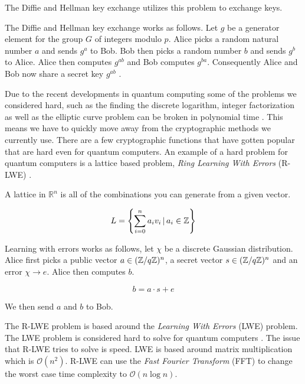 The Diffie and Hellman key exchange utilizes this problem to exchange keys.

\begin{definition}

    The Diffie and Hellman key exchange works as follows. Let $g$ be a generator
    element for the group $G$ of integers modulo $p$. Alice picks a random
    natural number $a$ and sends $g^a$ to Bob. Bob then picks a random number
    $b$ and sends $g^b$ to Alice. Alice then computes $g^{ab}$ and Bob computes
    $g^{ba}$. Consequently Alice and Bob now share a secret key $g^{ab}$
    \citep{FranciscoRodriguez-Henriquez10}.

\end{definition}

Due to the recent developments in quantum computing some of the problems we
considered hard, such as the finding the discrete logarithm, integer
factorization as well as the elliptic curve problem can be broken in polynomial
time \citep{ShorQuantum}. This means we have to quickly move away from the
cryptographic methods we currently use. There are a few cryptographic functions
that have gotten popular that are hard even for quantum computers. An example
of a hard problem for quantum computers is a lattice based problem,
\textit{Ring Learning With Errors} (R-LWE)
\citep{FPGA_Post_Quantum_Primitives}.

\begin{definition}
    A lattice in $\mathbb{R}^n$ is all of the combinations you can generate
    from a given vector.

    \[L = \left\{ \sum_{i = 0}^n a_iv_i \, | \, a_i \in \mathbb{Z} \right\}\]
\end{definition}

\begin{definition}
    Learning with errors works as follows, let $\chi$ be a discrete Gaussian
    distribution. Alice first picks a public vector $a \in (\mathbb{Z} / q\mathbb{Z})^n$, a
    secret vector $s \in (\mathbb{Z} / q\mathbb{Z})^n$ and an error $\chi \rightarrow e$.
    Alice then computes $b$.

    \[ b = a \cdot s + e \]

    We then send $a$ and $b$ to Bob.
\end{definition}

The R-LWE problem is based around the \textit{Learning With Errors} (LWE)
problem. The LWE problem is considered hard to solve for quantum computers
\citep{Regev05}. The issue that R-LWE tries to solve is speed. LWE is based
around matrix multiplication which is $\mathcal{O}(n^2)$. R-LWE can use the
\textit{Fast Fourier Transform} (FFT) to change the worst case time complexity
to $\mathcal{O}(n\log n)$.

